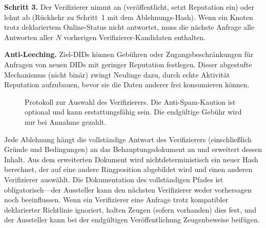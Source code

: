 \documentclass[11pt,a4paper,twocolumn]{article}
\begin{document}
\textbf{Schritt 3.} Der Verifizierer nimmt an (veröffentlicht, setzt Reputation ein) oder lehnt ab (Rückkehr zu Schritt~1 mit dem Ablehnungs-Hash). Wenn ein Knoten trotz deklariertem Online-Status nicht antwortet, muss die nächste Anfrage alle Antworten aller $N$ vorherigen Verifizierer-Kandidaten enthalten.

\textbf{Anti-Leeching.} Ziel-DIDs können Gebühren oder Zugangsbeschränkungen für Anfragen von neuen DIDs mit geringer Reputation festlegen. Dieser abgestufte Mechanismus (nicht binär) zwingt Neulinge dazu, durch echte Aktivität Reputation aufzubauen, bevor sie die Daten anderer frei konsumieren können.

\begin{figure}[ht]
\centering
{}
\caption{Protokoll zur Auswahl des Verifizierers. Die Anti-Spam-Kaution ist optional und kann erstattungsfähig sein. Die endgültige Gebühr wird nur bei Annahme gezahlt.}
\label{fig:verifier}
\end{figure}

Jede Ablehnung hängt die vollständige Antwort des Verifizierers (einschließlich Gründe und Bedingungen) an das Behauptungsdokument an und erweitert dessen Inhalt. Aus dem erweiterten Dokument wird nichtdeterministisch ein neuer Hash berechnet, der auf eine andere Ringposition abgebildet wird und einen anderen Verifizierer auswählt. Die Dokumentation des vollständigen Pfades ist obligatorisch---der Aussteller kann den nächsten Verifizierer weder vorhersagen noch beeinflussen. Wenn ein Verifizierer eine Anfrage trotz kompatibler deklarierter Richtlinie ignoriert, halten Zeugen (sofern vorhanden) dies fest, und der Aussteller kann bei der endgültigen Veröffentlichung Zeugenbeweise beifügen.
\end{document}
